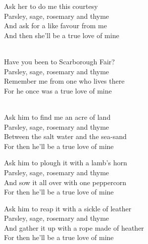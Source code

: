 \documentclass{article}
\newcommand{\lyricline}[1]{%
  \color{lyriccolor}\normalsize\mdseries #1%
}
\newcommand{\paragraphtitle}[1]{%
  \noindent{\color{titlecolor}\footnotesize\mdseries\scshape #1}\\[0.3em]%
}
\begin{document}
{\begin{minipage}{\linewidth}
\raggedright
\noindent \lyricline{Ask her to do me this courtesy}\\
\noindent \lyricline{Parsley, sage, rosemary and thyme}\\
\noindent \lyricline{And ask for a like favour from me}\\
\noindent \lyricline{And then she'll be a true love of mine}\\
\end{minipage}


\begin{minipage}{\linewidth}
\raggedright
\paragraphtitle{Both}
\noindent \lyricline{Have you been to Scarborough Fair?}\\
\noindent \lyricline{Parsley, sage, rosemary and thyme}\\
\noindent \lyricline{Remember me from one who lives there}\\
\noindent \lyricline{For he once was a true love of mine}\\
\end{minipage}


\begin{minipage}{\linewidth}
\raggedright
\paragraphtitle{Woman}
\noindent \lyricline{Ask him to find me an acre of land}\\
\noindent \lyricline{Parsley, sage, rosemary and thyme}\\
\noindent \lyricline{Between the salt water and the sea-sand}\\
\noindent \lyricline{For then he'll be a true love of mine}\\
\end{minipage}


\begin{minipage}{\linewidth}
\raggedright
\noindent \lyricline{Ask him to plough it with a lamb's horn}\\
\noindent \lyricline{Parsley, sage, rosemary and thyme}\\
\noindent \lyricline{And sow it all over with one peppercorn}\\
\noindent \lyricline{For then he'll be a true love of mine}\\
\end{minipage}


\begin{minipage}{\linewidth}
\raggedright
\noindent \lyricline{Ask him to reap it with a sickle of leather}\\
\noindent \lyricline{Parsley, sage, rosemary and thyme}\\
\noindent \lyricline{And gather it up with a rope made of heather}\\
\noindent \lyricline{For then he'll be a true love of mine}\\
\end{minipage}


}
\end{document}

